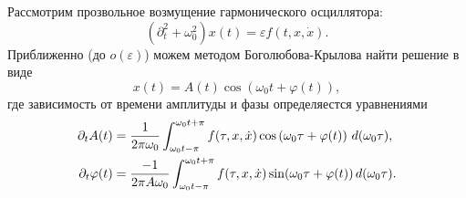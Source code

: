 
Рассмотрим прозвольное возмущение гармонического осциллятора:
\begin{equation}
    \left(\partial_t^2 + \omega_0^2\right) x(t) = \varepsilon f(t, x, \dot{x}).
    \label{sloweq}
\end{equation}
Приближенно (до $o(\varepsilon)$) можем методом Боголюбова-Крылова найти
решение в виде
\begin{equation}
    x(t) = A(t) \cos(\omega_0 t + \varphi(t)),
    \label{sloweqview}
\end{equation}
где зависимость от времени амплитуды и фазы определяестся уравнениями
\begin{align}
    \partial_t A(t) &= \frac{1}{2\pi \omega_0}\int_{\omega_0 t-\pi}^{\omega_0 t+\pi} f(\tau, x, \dot{x}) \cos\left(\omega_0 \tau + \varphi(t)\right) \, d (\omega_0\tau), 
    \label{slowA}
    \\
    \partial_t \varphi(t) &= \frac{-1}{2 \pi A \omega_0} \int_{\omega_0 t-\pi}^{\omega_0 t + \pi} f(\tau, x, \dot{x}) \sin(\omega_0 \tau + \varphi(t)) \, d (\omega_0 \tau).
    \label{slowphi}
\end{align}
